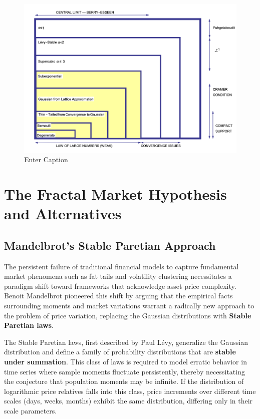 \documentclass{ieeetj}
\begin{document}
\begin{figure}
    \centering
    \includegraphics[width=1\linewidth]{tablue_of_thick_tails.png}
    \caption{Enter Caption}
    \label{fig:placeholder}
\end{figure}

\section{The Fractal Market Hypothesis and Alternatives}

\subsection{Mandelbrot’s Stable Paretian Approach}

The persistent failure of traditional financial models to capture fundamental market phenomena such as fat tails and volatility clustering necessitates a paradigm shift toward frameworks that acknowledge asset price complexity. Benoit Mandelbrot pioneered this shift by arguing that the empirical facts surrounding moments and market variations warrant a radically new approach to the problem of price variation, replacing the Gaussian distributions with \textbf{Stable Paretian laws}.

The Stable Paretian laws, first described by Paul Lévy, generalize the Gaussian distribution and define a family of probability distributions that are \textbf{stable under summation}. This class of laws is required to model erratic behavior in time series where sample moments fluctuate persistently, thereby necessitating the conjecture that population moments may be infinite. If the distribution of logarithmic price relatives falls into this class, price increments over different time scales (days, weeks, months) exhibit the same distribution, differing only in their scale parameters.
\end{document}
